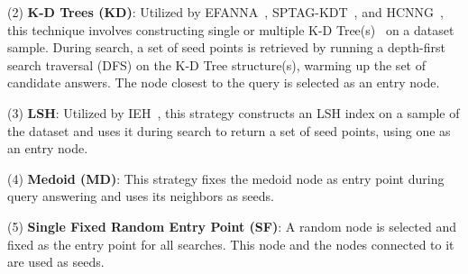     
\noindent (2) \textbf{K-D Trees (KD)}: Utilized by EFANNA~\cite{efanna}, SPTAG-KDT~\cite{SPTAG2}, and HCNNG~\cite{hcnng}, this technique involves constructing single or multiple K-D Tree(s)~\cite{kdtree} on a dataset sample. During search, a set of seed points is retrieved by running a depth-first search traversal (DFS) on the K-D Tree structure(s), warming up the set of candidate answers. The node closest to the query is selected as an entry node.

\noindent (3) \textbf{LSH}: Utilized by IEH~\cite{ieh}, this strategy constructs an LSH index
on a sample of the dataset and uses it during search to return a set of seed points, using one as an entry node. %


\noindent (4) \textbf{Medoid (MD)}: 
This strategy fixes the medoid node as entry point during query answering and uses its neighbors as seeds.

\noindent (5) \textbf{Single Fixed Random Entry Point (SF)}: A random node is selected and fixed as the entry point for all searches. This node and the nodes connected to it are used as seeds.
    
